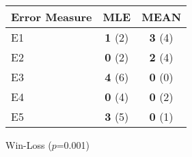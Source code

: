 \vspace{.22\textwidth}
\begin{center}
\begin{tabular}{lcc}
\hline
Error Measure  & MLE   & MEAN  \\\hline
E1 & \textbf{1} (2) & \textbf{3} (4) \\
E2 & \textbf{0} (2) & \textbf{2} (4) \\
E3 & \textbf{4} (6) & \textbf{0} (0) \\
E4 & \textbf{0} (4) & \textbf{0} (2) \\
E5 & \textbf{3} (5) & \textbf{0} (1) \\\hline
\end{tabular}
\caption{Win-Loss ($p$=0.001) \label{t:winloss}}
\end{center}
